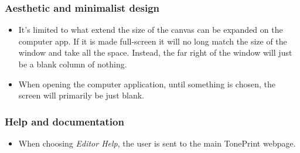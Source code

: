 \subsubsection{Aesthetic and minimalist design}
\begin{itemize}
	\item It’s limited to what extend the size of the canvas can be expanded on the computer app. If it is made full-screen it will no long match the size of the window and take all the space. Instead, the far right of the window will just be a blank column of nothing.\\
	\item When opening the computer application, until something is chosen, the screen will primarily be just blank.
\end{itemize}
%
%
\subsubsection{Help and documentation}
\begin{itemize}
	\item When choosing \textit{Editor Help}, the user is sent to the main TonePrint webpage.
\end{itemize}
%